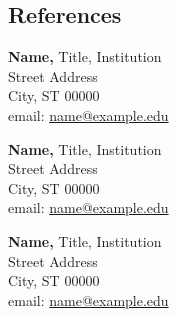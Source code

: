 \begin{resume}
\section{References}
\vspace*{.05in}
\parbox{\textwidth}{%
{\bf Name,} Title, Institution \\
Street Address \\
City, ST 00000 \\
email: \href{mailto:name@example.edu}{name@example.edu}}
\par
\parbox{\textwidth}{%
{\bf Name,} Title, Institution \\
Street Address \\
City, ST 00000 \\
email: \href{mailto:name@example.edu}{name@example.edu}}
\par
\parbox{\textwidth}{%
{\bf Name,} Title, Institution \\
Street Address \\
City, ST 00000 \\
email: \href{mailto:name@example.edu}{name@example.edu}}

\end{resume}


